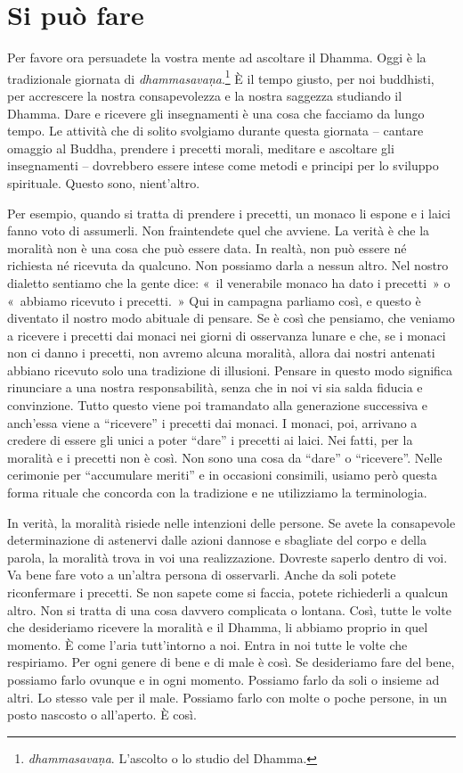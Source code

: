 \chapter{Si può fare}

Per favore ora persuadete la vostra mente ad ascoltare il Dhamma. Oggi è
la tradizionale giornata di \emph{dhammasavaṇa}.\footnote{\emph{dhammasavaṇa}.
  L'ascolto o lo studio del Dhamma.} È il tempo giusto, per noi
buddhisti, per accrescere la nostra consapevolezza e la nostra saggezza
studiando il Dhamma. Dare e ricevere gli insegnamenti è una cosa che
facciamo da lungo tempo. Le attività che di solito svolgiamo durante
questa giornata -- cantare omaggio al Buddha, prendere i precetti
morali, meditare e ascoltare gli insegnamenti -- dovrebbero essere
intese come metodi e principi per lo sviluppo spirituale. Questo sono,
nient'altro.

Per esempio, quando si tratta di prendere i precetti, un monaco li
espone e i laici fanno voto di assumerli. Non fraintendete quel che
avviene. La verità è che la moralità non è una cosa che può essere data.
In realtà, non può essere né richiesta né ricevuta da qualcuno. Non
possiamo darla a nessun altro. Nel nostro dialetto sentiamo che la gente
dice: «~il venerabile monaco ha dato i precetti~» o «~abbiamo ricevuto i
precetti.~» Qui in campagna parliamo così, e questo è diventato il
nostro modo abituale di pensare. Se è così che pensiamo, che veniamo a
ricevere i precetti dai monaci nei giorni di osservanza lunare e che, se
i monaci non ci danno i precetti, non avremo alcuna moralità, allora dai
nostri antenati abbiano ricevuto solo una tradizione di illusioni.
Pensare in questo modo significa rinunciare a una nostra responsabilità,
senza che in noi vi sia salda fiducia e convinzione. Tutto questo viene
poi tramandato alla generazione successiva e anch'essa viene a
``ricevere'' i precetti dai monaci. I monaci, poi, arrivano a credere di
essere gli unici a poter ``dare'' i precetti ai laici. Nei fatti, per la
moralità e i precetti non è così. Non sono una cosa da ``dare'' o
``ricevere''. Nelle cerimonie per ``accumulare meriti'' e in occasioni
consimili, usiamo però questa forma rituale che concorda con la
tradizione e ne utilizziamo la terminologia.

In verità, la moralità risiede nelle intenzioni delle persone. Se avete
la consapevole determinazione di astenervi dalle azioni dannose e
sbagliate del corpo e della parola, la moralità trova in voi una
realizzazione. Dovreste saperlo dentro di voi. Va bene fare voto a
un'altra persona di osservarli. Anche da soli potete riconfermare i
precetti. Se non sapete come si faccia, potete richiederli a qualcun
altro. Non si tratta di una cosa davvero complicata o lontana. Così,
tutte le volte che desideriamo ricevere la moralità e il Dhamma, li
abbiamo proprio in quel momento. È come l'aria tutt'intorno a noi. Entra
in noi tutte le volte che respiriamo. Per ogni genere di bene e di male
è così. Se desideriamo fare del bene, possiamo farlo ovunque e in ogni
momento. Possiamo farlo da soli o insieme ad altri. Lo stesso vale per
il male. Possiamo farlo con molte o poche persone, in un posto nascosto
o all'aperto. È così.

